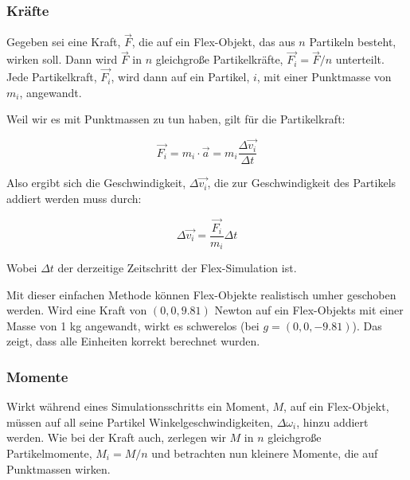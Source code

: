 \subsubsection{Kräfte}
Gegeben sei eine Kraft, $\vec{F}$, die auf ein Flex-Objekt, das aus $n$ Partikeln besteht, wirken soll. Dann wird $\vec{F}$ in $n$ gleichgroße Partikelkräfte, $\vec{F_i} = \vec{F} / n$ unterteilt. Jede Partikelkraft, $\vec{F_i}$, wird dann auf ein Partikel, $i$, mit einer Punktmasse von $m_i$, angewandt.

Weil wir es mit Punktmassen zu tun haben, gilt für die Partikelkraft:

\begin{equation}
\vec{F_i} = m_i \cdot \vec{a} = m_i \dfrac{\Delta \vec{v_i}}{\Delta t}
\label{form_F}
\end{equation}

Also ergibt sich die Geschwindigkeit, $\Delta \vec{v_i}$, die zur Geschwindigkeit des Partikels addiert werden muss durch:

\begin{equation}
\Delta \vec{v_i} = \dfrac{\vec{F_i}}{m_i}\Delta t
\label{form_dv}
\end{equation}

Wobei $\Delta t$ der derzeitige Zeitschritt der Flex-Simulation ist. 


Mit dieser einfachen Methode können Flex-Objekte realistisch umher geschoben werden. Wird eine Kraft von $(0 , 0 , 9.81 )$ Newton auf ein Flex-Objekts mit einer Masse von 1 kg angewandt, wirkt es schwerelos (bei $g=(0 , 0 , -9.81 )$). Das zeigt, dass alle Einheiten korrekt berechnet wurden.


\subsubsection{Momente}

Wirkt während eines Simulationsschritts ein Moment, $M$, auf ein Flex-Objekt, müssen auf all seine Partikel Winkelgeschwindigkeiten, $\Delta \omega_i$, hinzu addiert werden. Wie bei der Kraft auch, zerlegen wir $M$ in $n$ gleichgroße Partikelmomente, $M_i=M/n$ und betrachten nun kleinere Momente, die auf Punktmassen wirken.

